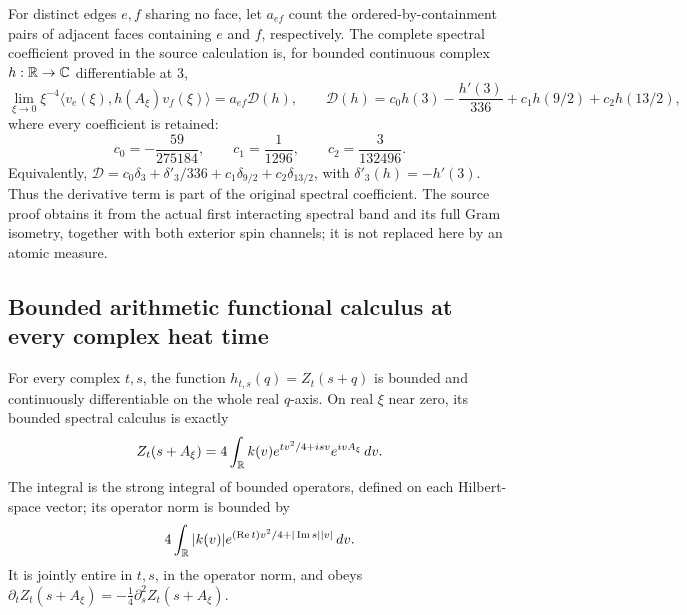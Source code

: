 For distinct edges \(e,f\) sharing no face, let \(a_{ef}\) count
the ordered-by-containment pairs of adjacent faces containing
\(e\) and \(f\), respectively. The complete spectral coefficient
proved in the source calculation is, for bounded continuous complex
\(h:\mathbb R\to\mathbb C\) differentiable at \(3\),
\begin{equation}
\lim_{\xi\to0}\xi^{-4}
 \langle v_e(\xi),h(A_\xi)v_f(\xi)\rangle
 =a_{ef}\mathcal D(h),
\qquad
\mathcal D(h)=c_0h(3)-\frac{h'(3)}{336}
                  +c_1h(9/2)+c_2h(13/2),
\label{xat:source-functional}
\end{equation}
where every coefficient is retained:
\begin{equation}
c_0=-\frac{59}{275184},\qquad
c_1=\frac1{1296},\qquad c_2=\frac3{132496}.
\label{xat:coefficients}
\end{equation}
Equivalently,
\(\mathcal D=c_0\delta_3+\delta'_3/336+
c_1\delta_{9/2}+c_2\delta_{13/2}\), with
\(\delta'_3(h)=-h'(3)\). Thus the derivative term is part of the
original spectral coefficient. The source proof obtains it from the
actual first interacting spectral band and its full Gram isometry,
together with both exterior spin channels; it is not replaced here
by an atomic measure.

\subsection{Bounded arithmetic functional calculus at every complex heat time}

\begin{lemma}
\label{xat:bounded-test}
For every complex \(t,s\), the function
\(h_{t,s}(q)=Z_t(s+q)\) is bounded and continuously differentiable
on the whole real \(q\)-axis. On real \(\xi\) near zero, its
bounded spectral calculus is exactly
\begin{equation}
Z_t(s+A_\xi)
 =4\int_\mathbb R k(v)e^{tv^2/4+isv}e^{ivA_\xi}\,dv.
\label{xat:operator-Fourier}
\end{equation}
The integral is the strong integral of bounded operators, defined on
each Hilbert-space vector; its operator norm is bounded by
\begin{equation}
4\int_\mathbb R |k(v)|
       e^{(\operatorname{Re}t)v^2/4+|\operatorname{Im}s||v|}\,dv.
\label{xat:operator-bound}
\end{equation}
It is jointly entire in \(t,s\), in the operator norm, and obeys
\(\partial_t Z_t(s+A_\xi)=-\tfrac14\partial_s^2Z_t(s+A_\xi)\).
\end{lemma}

